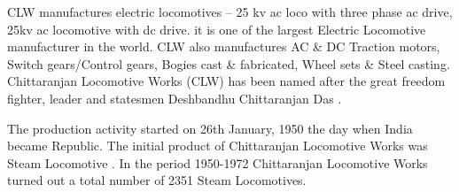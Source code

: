 CLW manufactures electric locomotives -- 25 kv ac loco with three phase ac drive, 25kv ac locomotive with dc drive. it is one of the largest Electric Locomotive manufacturer in the world. CLW also manufactures AC \& DC Traction motors, Switch gears/Control gears, Bogies cast \& fabricated, Wheel sets \& Steel casting. Chittaranjan Locomotive Works (CLW) has been named after the great freedom fighter, leader and statesmen Deshbandhu Chittaranjan Das .

The production activity started on 26th January, 1950 the day when India became Republic. The initial product of Chittaranjan Locomotive Works was Steam Locomotive . In the period 1950-1972 Chittaranjan Locomotive Works turned out a total number of 2351 Steam Locomotives.
